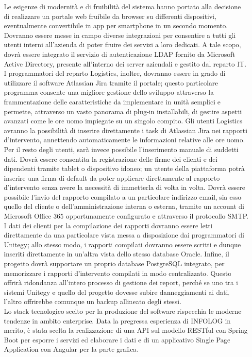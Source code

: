 Le esigenze di modernità e di fruibilità del sistema hanno portato alla decisione di realizzare un portale web fruibile da browser su differenti dispositivi, eventualmente
convertibile in app per smartphone in un secondo momento.
Dovranno essere messe in campo diverse integrazioni per consentire a tutti gli utenti interni all'azienda di poter fruire dei servizi a loro dedicati.
A tale scopo, dovrà essere integrato il servizio di autenticazione LDAP fornito da Microsoft Active Directory, presente all'interno dei server aziendali e gestito dal reparto IT.
I programmatori del reparto Logistics, inoltre, dovranno essere in grado di utilizzare il software Atlassian Jira tramite il portale;
questo particolare programma consente una migliore gestione dello sviluppo attraverso la frammentazione delle caratteristiche da implementare in unità semplici e permette, attraverso
un vasto panorama di plug-in installabili, di gestire aspetti avanzati come le ore uomo impiegate su un singolo compito.
Gli utenti Logistics avranno la possibilità di inserire direttamente i task di Atlassian Jira nei rapporti d'intervento, annettendo automaticamente le informazioni relative alle ore uomo.
Per il resto degli utenti, sarà invece possibile l'inserimento manuale di suddetti dati.
Dovrà essere consentita la registrazione delle firme dei clienti e dei dipendenti tramite tablet o dispositivo idoneo; un utente della piattaforma potrà inserire una firma di default
da poter applicare direttamente al rapporto d'intervento senza avere la necessità di immetterla di volta in volta.
Dovrà essere possibile l'invio del rapporto compilato a un particolare indirizzo email, sia esso quello del cliente o dell'amministrazione interna o esterna, tramite un account di
Microsoft Office 365 opportunamente configurato e attraverso il protocollo SMTP.
I dati dei clienti per la compilazione dei rapporti dovranno essere letti direttamente da una particolare vista messa a disposizione dai programmatori di Unitegy; allo stesso modo, 
i rapporti compilati dovranno essere scritti e dunque inseriti direttamente in un'altra vista dello stesso database Oracle.
Infine, il progetto dovrà supportare un proprio database PostgreSQL integrato, per memorizzare i rapporti d'intervento compilati in modo centralizzato.
Questo offrirà ridondanza all'intero processo di gestione dei report, perché se uno tra i sistemi Unitegy e quello del progetto dovesse subire danneggiamenti ai dati, l'altro
offrirebbe comunque un backup allineato degli stessi.
\\
Lo stack tecnologico scelto per la produzione del software rispecchia le moderne tendenze in ambito enterprise.
Data la pregressa esperienza di INFOLOG in merito, è stata scelta la realizzazione di una API sul modello RESTful con Spring Boot per esporre i servizi ed elaborare i dati
e di un applicativo Single Page Application con Angular per la parte grafica.